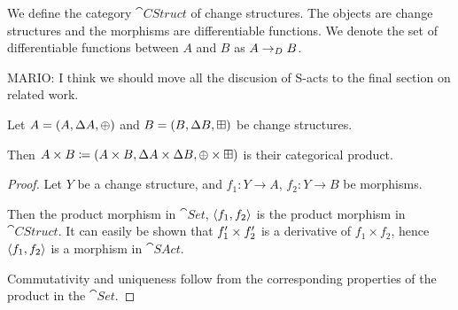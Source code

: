 \begin{defn}
  We define the category $\cat{CStruct}$ of change structures. The objects are
  change structures and the morphisms are differentiable functions. We denote
  the set of differentiable functions between $A$ and $B$ as $A \rightarrow_{D} B$.
\end{defn}

MARIO: I think we should move all the discusion of S-acts to the final section
on related work.


\begin{prop}[Products]
  Let $A = (A,\Delta A,\oplus)$ and $B =
  (B,\Delta B,\boxplus)$ be change structures.

  Then $A \times B \coloneqq (A \times B,\Delta A \times
  \Delta B,\oplus \times \boxplus)$ is their categorical product.
\end{prop}
\begin{proof}
  Let $Y$ be a change structure, and $f_1: Y \rightarrow A$, $f_2: Y
  \rightarrow B$ be morphisms.

  Then the product morphism in $\cat{Set}$, $\left\langle {f_1}, {f_2} \right\rangle$ is the product
  morphism in $\cat{CStruct}$. It can easily be
  shown that $f_1' \times f_2'$ is a derivative of $f_1 \times f_2$,
  hence $\left\langle {f_1}, {f_2} \right\rangle$ is a morphism in $\cat{SAct}$.

  Commutativity and uniqueness follow from the corresponding properties of the
  product in the $\cat{Set}$.
\end{proof}


